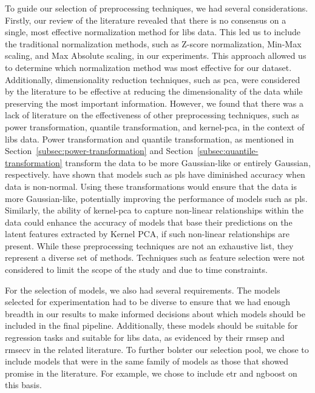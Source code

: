 To guide our selection of preprocessing techniques, we had several considerations.
Firstly, our review of the literature revealed that there is no consensus on a single, most effective normalization method for \gls{libs} data.
This led us to include the traditional normalization methods, such as Z-score normalization, Min-Max scaling, and Max Absolute scaling, in our experiments.
This approach allowed us to determine which normalization method was most effective for our dataset. 
Additionally, dimensionality reduction techniques, such as \gls{pca}, were considered by the literature to be effective at reducing the dimensionality of the data while preserving the most important information. 
However, we found that there was a lack of literature on the effectiveness of other preprocessing techniques, such as power transformation, quantile transformation, and \gls{kernel-pca}, in the context of \gls{libs} data.
Power transformation and quantile transformation, as mentioned in Section~\ref{subsec:power-transformation} and Section~\ref{subsec:quantile-transformation} transform the data to be more Gaussian-like or entirely Gaussian, respectively.
\citet{pls_non_normal_data} have shown that models such as \gls{pls} have diminished accuracy when data is non-normal.
Using these transformations would ensure that the data is more Gaussian-like, potentially improving the performance of models such as \gls{pls}.
Similarly, the ability of \gls{kernel-pca} to capture non-linear relationships within the data could enhance the accuracy of models that base their predictions on the latent features extracted by Kernel PCA, if such non-linear relationships are present.
While these preprocessing techniques are not an exhaustive list, they represent a diverse set of methods.
Techniques such as feature selection were not considered to limit the scope of the study and due to time constraints.

For the selection of models, we also had several requirements.
The models selected for experimentation had to be diverse to ensure that we had enough breadth in our results to make informed decisions about which models should be included in the final pipeline.
Additionally, these models should be suitable for regression tasks and suitable for \gls{libs} data, as evidenced by their \gls{rmsep} and \gls{rmsecv} in the related literature.
To further bolster our selection pool, we chose to include models that were in the same family of models as those that showed promise in the literature.
For example, we chose to include \gls{etr} and \gls{ngboost} on this basis.

